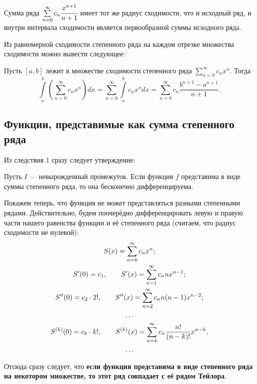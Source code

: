 \documentclass[a4paper, 12pt]{article}
\begin{document}
\begin{Consequence}
    Сумма ряда $\sum\limits_{n=0}^{\infty}c_n \cfrac{x^{n+1}}{n + 1}$ имеет тот же радиус сходимости, что и исходный ряд, и внутри интервала сходимости является первообразной суммы исходного ряда.
\end{Consequence}
Из равномерной сходимости степенного ряда на каждом отрезке множества сходимости можно вывести следующее:
\begin{Consequence}
    Пусть $[a,b]$ лежит в множестве сходимости степенного ряда $\sum\limits_{n = 0}^{\infty}c_n x^n$. Тогда 
    $$
    \int\limits_a^b\left(\sum\limits_{n = 0}^{\infty}c_n x^n\right)dx = \sum\limits_{n= 0}^{\infty} \int\limits_a^bc_n x^ndx = \sum\limits_{n=0}^\infty c_n \frac{b^{n+1} - a^{n+1}}{n+1}.
    $$
\end{Consequence}

\subsection{Функции, представимые как сумма степенного ряда}

Из следствия 1 сразу следует утверждение:
\begin{Statement}
    Пусть $I$ --- невырожденный промежуток. Если функция $f$ представима в виде суммы степенного ряда, то она бесконечно дифференцируема.
\end{Statement}

Покажем теперь, что функция не может представляться разными степенными рядами.  Действительно, будем поочерёдно дифференцировать левую и правую части нашего равенства функции и её степенного ряда (считаем, что радиус сходимости не нулевой):
    \begin{gather*}
        S(x) = \sum\limits_{n = 0}^{\infty} c_n x^n;\\
        S'(0) = c_1, \qquad S'(x) = \sum\limits_{n=1}^{\infty} c_n n x^{n-1};\\
        S''(0) = c_2\cdot 2!, \qquad S''(x) = \sum\limits_{n=2}^{\infty} c_n n(n-1) x^{n-2}; \\
        \ldots\\
        S^{(k)}(0) = c_k \cdot k!, \qquad S^{(k)}(x) = \sum\limits_{n=k}^{\infty} c_n \frac{n!}{(n-k)!} x^{n-k}, \\
        \ldots
    \end{gather*}

Отсюда сразу следует, что \textbf{если функция представима в виде степенного ряда на некотором множестве, то этот ряд совпадает с её рядом Тейлора}.
\end{document}
